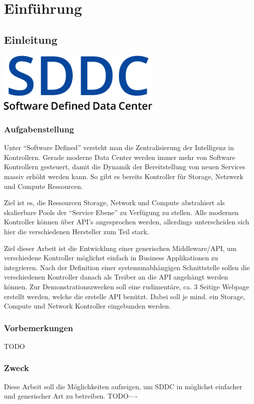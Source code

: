 \part{Einführung}
\chapter{Einleitung}
\begin{center}
  \includegraphics[width=0.6\textwidth]{./22_Grafiken/01_Logo/SDDC}
\end{center}

\section{Aufgabenstellung}

Unter ``Software Defined'' versteht man die Zentralisierung der Intelligenz in Kontrollern. 
Gerade moderne Data Center werden immer mehr von Software Kontrollern gesteuert, 
damit die Dynamik der Bereitstellung von neuen Services massiv erhöht werden kann. 
So gibt es bereits Kontroller für Storage, Netzwerk und Compute Ressourcen. 

Ziel ist es, die Ressourcen Storage, Network und Compute abstrahiert als skalierbare Pools der 
``Service Ebene'' zu Verfügung zu stellen. Alle modernen Kontroller können über API's 
angesprochen werden, allerdings unterscheiden sich hier die verschiedenen Hersteller zum Teil stark.

Ziel dieser Arbeit ist die Entwicklung einer generischen Middleware/API, um verschiedene Kontroller 
möglichst einfach in Business Applikationen zu integrieren. Nach der Definition einer systemunabhängigen 
Schnittstelle sollen die verschiedenen Kontroller danach als Treiber an die API angehängt werden können. 
Zur Demonstrationszwecken soll eine rudimentäre, ca. 3 Seitige Webpage erstellt werden, welche die erstelle 
API benützt. Dabei soll je mind. ein Storage, Compute und Network Kontroller eingebunden werden.

\section{Vorbemerkungen}
TODO
\section{Zweck}
Diese Arbeit soll die Möglichkeiten aufzeigen, um \ac{SDDC} in möglichst einfacher 
und generischer Art zu betreiben.
TODO----
